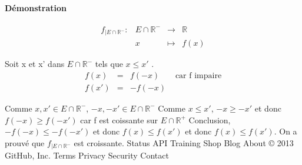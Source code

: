 \paragraph{Démonstration} 
\begin{align*}
	f_{|E\cap \mathbb{R}^-} : & E\cap \mathbb{R}^- &\rightarrow &\mathbb{R}\\
												 & x & \mapsto & f(x)
\end{align*}

Soit x et x' dans $E \cap \mathbb{R}^-$ tels que $x \leq x'$ . 
\begin{align*}
	f(x) & = & f(-x) & \text{ car f impaire} \\
	f(x') & = & -f(-x)
\end{align*}

Comme $x, x' \in E \cap \mathbb{R}^-$, $-x, -x' \in E \cap \mathbb{R}^-$
Comme $x \leq x'$, $-x \geq -x'$
et donc $f(-x) \geq f(-x')$ car f est coissante sur $E\cap \mathbb{R}^+$
Conclusion, $-f(-x) \leq -f(-x')$ et donc $f(x) \leq f(x')$ et donc $f(x) \leq f(x')$. On a prouvé que $f_{|E \cap \mathbb{R}^-}$ est croissante.
Status API Training Shop Blog About © 2013 GitHub, Inc. Terms Privacy Security Contact 
